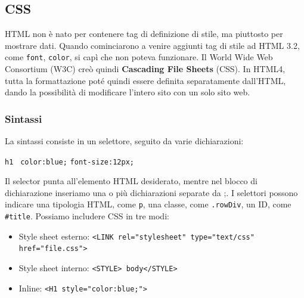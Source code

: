 \documentclass[11pt]{article}
\newcommand{\code}[1]{\texttt{#1}}
\begin{document}
\subsection{CSS}
HTML non è nato per contenere tag di definizione di stile, ma piuttosto per mostrare dati. Quando cominciarono a venire aggiunti tag di stile ad HTML 3.2, come \code{font}, \code{color}, si capì che non poteva funzionare. Il World Wide Web Consortium (W3C) creò quindi \textbf{Cascading File Sheets} (CSS). In HTML4, tutta la formattazione poté quindi essere definita separatamente dall'HTML, dando la possibilità di modificare l'intero sito con un solo sito web. 
\subsubsection{Sintassi}
La sintassi consiste in un selettore, seguito da varie dichiarazioni:
\begin{center}
    \code{h1 \textbraceleft}
    \code{color:blue;}
    \code{font-size:12px;}
    \code{\textbraceright}
\end{center}
Il selector punta all'elemento HTML desiderato, mentre nel blocco di dichiarazione inseriamo una o più dichiarazioni separate da ;.
I selettori possono indicare una tipologia HTML, come \code{p}, una classe, come \code{.rowDiv}, un ID, come \code{\#title}. Possiamo includere CSS in tre modi:
\begin{itemize}
    \item Style sheet esterno: \code{<LINK rel="stylesheet" type="text/css" href="file.css">}
    \item Style sheet interno: \code{<STYLE> body\textbraceleft\textbraceright</STYLE>}
    \item Inline: \code{<H1 style="color:blue;">}
\end{itemize}
\end{document}
